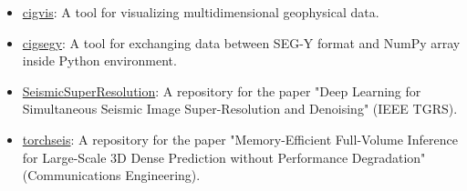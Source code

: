\begin{itemize}
    \item \href{https://github.com/JintaoLee-Roger/cigvis}{cigvis}: A tool for visualizing multidimensional geophysical data.

    \item \href{https://github.com/JintaoLee-Roger/cigsegy}{cigsegy}: A tool for exchanging data between SEG-Y format and NumPy array inside Python environment.

    \item \href{https://github.com/JintaoLee-Roger/SeismicSuperResolution}{SeismicSuperResolution}: A repository for the paper "Deep Learning for Simultaneous Seismic Image Super-Resolution and Denoising" (IEEE TGRS).

    \item \href{https://github.com/JintaoLee-Roger/torchseis}{torchseis}: A repository for the paper "Memory-Efficient Full-Volume Inference for Large-Scale 3D Dense Prediction without Performance Degradation" (Communications Engineering).


    
    

\end{itemize}




